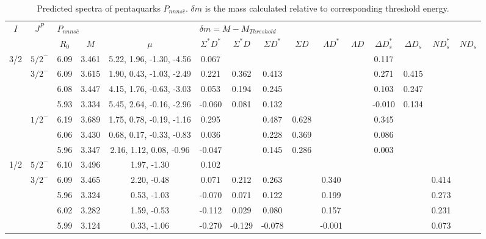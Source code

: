 \documentclass[prd,twocolumn,floatfix,nofootinbib]{revtex4}
\begin{document}
\renewcommand{\tabcolsep}{0.1cm}
\renewcommand{\arraystretch}{1.0}
\begin{table*}[!htbp]
    \caption{Predicted spectra of pentaquarks $P_{nnns\bar{c}}$.
        $\delta m$ is the mass calculated relative to corresponding threshold energy.}
    \label{tab:nnnsc}
    \begin{tabular}{cc|ccc|cccccccccc}
        \bottomrule[1.5pt]\bottomrule[0.5pt]
        \multirow{2}{*}{$I$} &\multirow{2}{*}{$J^{P}$} 
        &\multicolumn{3}{l|}{$P_{nnns\bar{c}}$} 
        &\multicolumn{10}{l}{$\delta m=M-M_{Threshold}$} \\
        & &$R_{0}$ &$M$ &$\mu$
        &$\Sigma^{\ast} D^{\ast}$ &$\Sigma^{\ast} D$ &$\Sigma D^{\ast}$ &$\Sigma D$ 
        &$\Lambda D^{\ast}$ &$\Lambda D$ &$\Delta D^{\ast}_{s}$ &$\Delta D_{s}$ 
        &$N D^{\ast}_{s}$ &$N D_{s}$ \\ \hline
        3/2
            &${5/2}^{-}$    &6.09   &3.461  &5.22, 1.96, -1.30, -4.56 &0.067 & & & & & &0.117 & & & \\
            &${3/2}^{-}$    &6.09   &3.615  &1.90, 0.43, -1.03, -2.49 &0.221 &0.362 &0.413 & & & &0.271 &0.415 & & \\
            &               &6.08   &3.447  &4.15, 1.76, -0.63, -3.03 &0.053 &0.194 &0.245 & & & &0.103 &0.247 & & \\
            &               &5.93   &3.334  &5.45, 2.64, -0.16, -2.96 &-0.060 &0.081 &0.132 & & & &-0.010 &0.134 & & \\
            &${1/2}^{-}$    &6.19   &3.689  &1.75, 0.78, -0.19, -1.16 &0.295 & &0.487 &0.628 & & &0.345 & & & \\
            &               &6.06   &3.430  &0.68, 0.17, -0.33, -0.83 &0.036 & &0.228 &0.369 & & &0.086 & & & \\
            &               &5.96   &3.347  &2.16, 1.12, 0.08, -0.96 &-0.047 & &0.145 &0.286 & & &0.003 & & & \\
        1/2
            &${5/2}^{-}$    &6.10   &3.496  &1.97, -1.30 &0.102 & & & & & & & & & \\
            &${3/2}^{-}$    &6.09   &3.465  &2.20, -0.48 &0.071 &0.212 &0.263 & &0.340 & & & &0.414 & \\
            &               &5.96   &3.324  &0.53, -1.03 &-0.070 &0.071 &0.122 & &0.199 & & & &0.273 & \\
            &               &6.02   &3.282  &1.59, -0.53 &-0.112 &0.029 &0.080 & &0.157 & & & &0.231 & \\
            &               &5.99   &3.124  &0.33, -1.06 &-0.270 &-0.129 &-0.078 & &-0.001 & & & &0.073 & \\

\end{tabular}
\end{table*}
\end{document}

